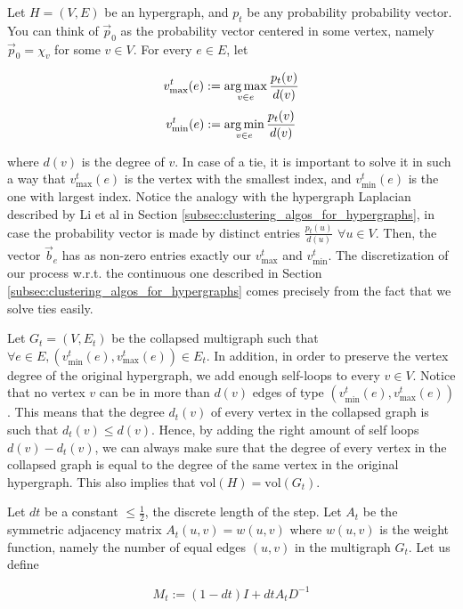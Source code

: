 \documentclass[../main.tex]{subfiles}
\begin{document}
Let $H = (V, E)$ be an hypergraph, and $p_t$ be any probability probability vector. You can think of $\vec{p}_0$ as the probability vector centered in some vertex, namely $\vec{p}_0 = \chi_v$ for some $v\in V$. For every $e\in E$, let

\begin{equation}
    v^t_{\text{max}}(e) := \operatorname*{arg\,max}_{v\in e} \frac{p_t(v)}{d(v)}
\end{equation} 
\begin{equation}
    v^t_{\text{min}}(e) := \operatorname*{arg\,min}_{v\in e} \frac{p_t(v)}{d(v)}
\end{equation}

where $d(v)$ is the degree of $v$. In case of a tie, it is important to solve it in such a way that $v^t_{\text{max}}(e)$ is the vertex with the smallest index, and $v^t_{\text{min}}(e)$ is the one with largest index. Notice the analogy with the hypergraph Laplacian described by Li et al in Section \ref{subsec:clustering_algos_for_hypergraphs}, in case the probability vector is made by distinct entries $\frac{p_t(u)}{d(u)}$ $\forall u\in V$. Then, the vector $\vec{b}_e$ has as non-zero entries exactly our $v_{\text{max}}^t$ and $v_{\text{min}}^t$. The discretization of our process w.r.t. the continuous one described in Section \ref{subsec:clustering_algos_for_hypergraphs} comes precisely from the fact that we solve ties easily.

Let $G_t = (V, E_t)$ be the collapsed multigraph such that $\forall e\in E, (v_{\text{min}}^t(e), v_{\text{max}}^t(e)) \in E_t$. In addition, in order to preserve the vertex degree of the original hypergraph, we add enough self-loops to every $v\in V$. Notice that no vertex $v$ can be in more than $d(v)$ edges of type $(v_{\text{min}}^t(e), v_{\text{max}}^t(e))$. This means that the degree $d_t(v)$ of every vertex in the collapsed graph is such that $d_t(v) \leq d(v)$. Hence, by adding the right amount of self loops $d(v) - d_t(v)$, we can always make sure that the degree of every vertex in the collapsed graph is equal to the degree of the same vertex in the original hypergraph. This also implies that $\text{vol}(H)= \text{vol}(G_t)$.

Let $dt$ be a constant $\leq \frac{1}{2}$, the discrete length of the step. Let $A_t$ be the symmetric adjacency matrix $A_t(u,v) = w(u,v)$ where $w(u,v)$ is the weight function, namely the number of equal edges $(u,v)$ in the multigraph $G_t$. Let us define 

\begin{equation}
    M_t := (1-dt)I + dtA_tD^{-1}
\end{equation}
\end{document}
